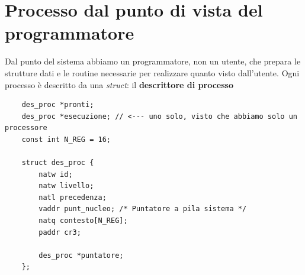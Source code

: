 \section{Processo dal punto di vista del programmatore}
Dal punto del sistema abbiamo un programmatore, non un utente, che prepara le strutture dati e le routine necessarie per realizzare quanto visto dall'utente. Ogni processo è descritto da una \emph{struct}: il \textbf{descrittore di processo}
\begin{verbatim}
	des_proc *pronti;
	des_proc *esecuzione; // <--- uno solo, visto che abbiamo solo un processore
	const int N_REG = 16;
	
	struct des_proc {
		natw id;
		natw livello;
		natl precedenza;
		vaddr punt_nucleo; /* Puntatore a pila sistema */
		natq contesto[N_REG];
		paddr cr3;
		
		des_proc *puntatore;
	};
\end{verbatim}
